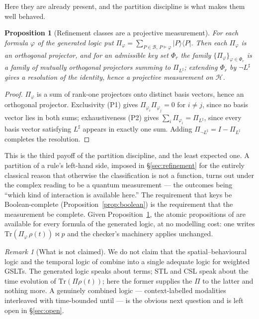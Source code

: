 \documentclass[11pt,a4paper]{article}
\theoremstyle{plain}
\newtheorem{proposition}[theorem]{Proposition}
\theoremstyle{definition}
\theoremstyle{remark}
\newtheorem{remark}[theorem]{Remark}
\begin{document}
Here they are already present, and the partition discipline is what makes them well behaved.

\begin{proposition}[Refinement classes are a projective measurement]
\label{prop:projective}
For each formula $\varphi$ of the generated logic put
$\Pi_\varphi = \sum_{P \in \mathcal{B},\, P \models \varphi} |P\rangle\langle P|$. Then each
$\Pi_\varphi$ is an orthogonal projector, and for an admissible key set $\Phi_r$ the family
$\{\Pi_\varphi\}_{\varphi \in \Phi_r}$ is a family of mutually orthogonal projectors summing to
$\Pi_{L^\sharp}$; extending $\Phi_r$ by $\neg L^\sharp$ gives a resolution of the identity, hence a
projective measurement on $\mathcal{H}$.
\end{proposition}

\begin{proof}
$\Pi_\varphi$ is a sum of rank-one projectors onto distinct basis vectors, hence an orthogonal
projector. Exclusivity (P1) gives $\Pi_{\varphi_i}\Pi_{\varphi_j} = 0$ for $i \neq j$, since no basis
vector lies in both sums; exhaustiveness (P2) gives $\sum_i \Pi_{\varphi_i} = \Pi_{L^\sharp}$, since
every basis vector satisfying $L^\sharp$ appears in exactly one sum. Adding
$\Pi_{\neg L^\sharp} = I - \Pi_{L^\sharp}$ completes the resolution.
\end{proof}

This is the third payoff of the partition discipline, and the least expected one. A partition of a
rule's left-hand side, imposed in \S\ref{sec:refinement} for the entirely classical reason that
otherwise the classification is not a function, turns out under the complex reading to be a quantum
measurement --- the outcomes being ``which kind of interaction is available here.'' The requirement
that keys be Boolean-complete (Proposition~\ref{prop:boolean}) is the requirement that the
measurement be complete. Given Proposition~\ref{prop:projective}, the atomic propositions of
\cite{qctmc,qctmc-csl} are available for every formula of the generated logic, at no modelling cost:
one writes $\mathrm{Tr}(\Pi_\varphi\,\rho(t)) \bowtie p$ and the checker's machinery applies
unchanged.

\begin{remark}[What is not claimed]
We do not claim that the spatial--behavioural logic and the temporal logic of \cite{qctmc} combine
into a single adequate logic for weighted GSLTs. The generated logic speaks about terms; STL and CSL
speak about the time evolution of $\mathrm{Tr}(\Pi\rho(t))$; here the former supplies the $\Pi$ to
the latter and nothing more. A genuinely combined logic --- context-labelled modalities interleaved
with time-bounded until --- is the obvious next question and is left open in \S\ref{sec:open}.
\end{remark}
\end{document}
